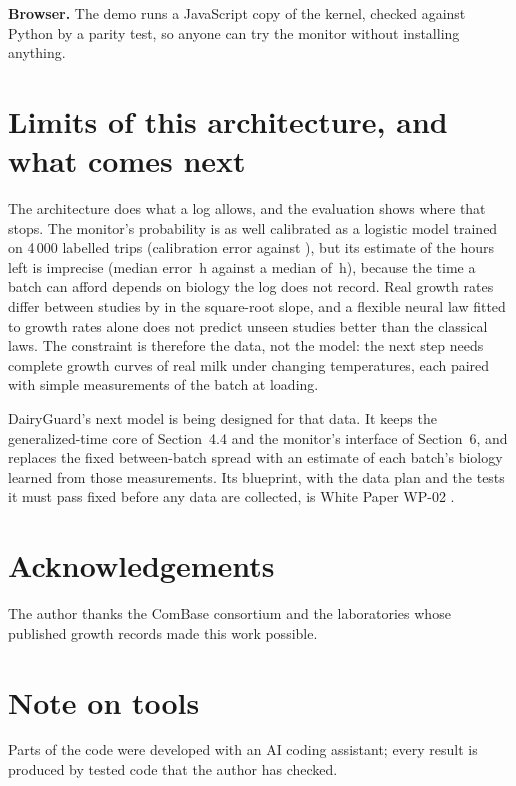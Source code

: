 \textbf{Browser.} The demo runs a JavaScript copy of the kernel, checked against Python by a parity test, so anyone can try the monitor without installing anything.

\section{Limits of this architecture, and what comes next}
The architecture does what a log allows, and the evaluation shows where that stops. The monitor's probability is as well calibrated as a logistic model trained on 4\,000 labelled trips (calibration error \MsCrateDgEce{} against \MsCrateLrEce), but its estimate of the hours left is imprecise (median error \MsHlErr\,h against a median of \MsHlTrue\,h), because the time a batch can afford depends on biology the log does not record. Real growth rates differ between studies by \GlCvB{} in the square-root slope, and a flexible neural law fitted to growth rates alone does not predict unseen studies better than the classical laws. The constraint is therefore the data, not the model: the next step needs complete growth curves of real milk under changing temperatures, each paired with simple measurements of the batch at loading.

DairyGuard's next model is being designed for that data. It keeps the generalized-time core of Section~4.4 and the monitor's interface of Section~6, and replaces the fixed between-batch spread with an estimate of each batch's biology learned from those measurements. Its blueprint, with the data plan and the tests it must pass fixed before any data are collected, is White Paper WP-02 \cite{wp02}.

\section*{Acknowledgements}
The author thanks the ComBase consortium and the laboratories whose published growth records made this work possible.

\section*{Note on tools}
Parts of the code were developed with an AI coding assistant; every result is produced by tested code that the author has checked.


